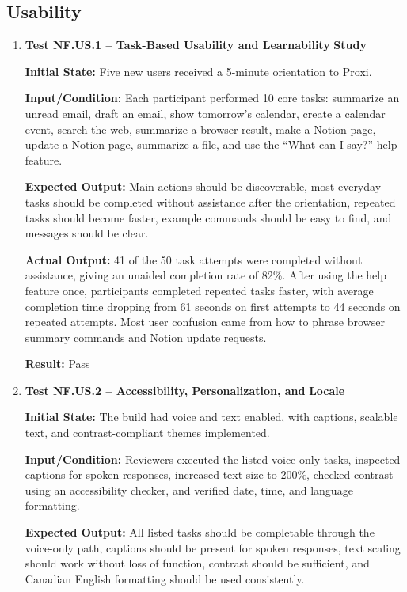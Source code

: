 \documentclass[12pt]{article}
\begin{document}
\subsection{Usability}

\begin{enumerate}
    \item \textbf{Test NF.US.1 -- Task-Based Usability and Learnability}
    \textbf{Study}
    
    \textbf{Initial State:} Five new users received a 5-minute
    orientation to Proxi.
    
    \textbf{Input/Condition:} Each participant performed 10 core
    tasks: summarize an unread email, draft an email, show tomorrow's
    calendar, create a calendar event, search the web, summarize a
    browser result, make a Notion page, update a Notion page,
    summarize a file, and use the ``What can I say?'' help feature.
    
    \textbf{Expected Output:} Main actions should be discoverable,
    most everyday tasks should be completed without assistance after
    the orientation, repeated tasks should become faster, example
    commands should be easy to find, and messages should be clear.
    
    \textbf{Actual Output:} 41 of the 50 task attempts were completed
    without assistance, giving an unaided completion rate of 82\%.
    After using the help feature once, participants completed repeated
    tasks faster, with average completion time dropping from
    61 seconds on first attempts to 44 seconds on repeated attempts.
    Most user confusion came from how to phrase browser summary
    commands and Notion update requests.
    
    \textbf{Result:} Pass

    \item \textbf{Test NF.US.2 -- Accessibility, Personalization, and}
    \textbf{Locale}
    
    \textbf{Initial State:} The build had voice and text enabled, with
    captions, scalable text, and contrast-compliant themes
    implemented.
    
    \textbf{Input/Condition:} Reviewers executed the listed voice-only
    tasks, inspected captions for spoken responses, increased text size
    to 200\%, checked contrast using an accessibility checker, and
    verified date, time, and language formatting.
    
    \textbf{Expected Output:} All listed tasks should be completable
    through the voice-only path, captions should be present for spoken
    responses, text scaling should work without loss of function,
    contrast should be sufficient, and Canadian English formatting
    should be used consistently.
    

\end{enumerate}
\end{document}
